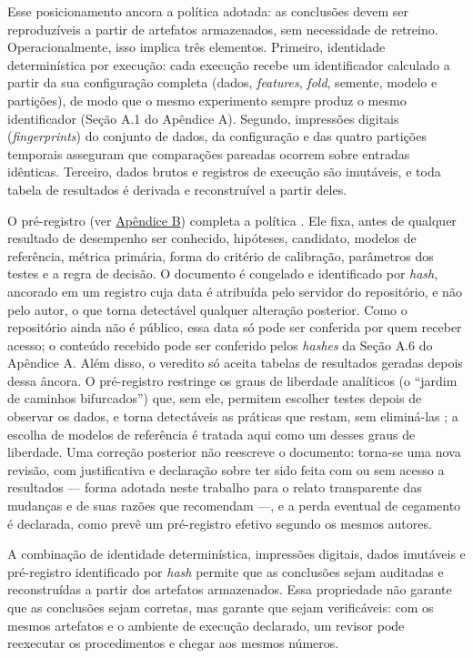 Esse posicionamento ancora a política adotada: as conclusões devem ser reproduzíveis a partir de artefatos armazenados, sem necessidade de retreino. Operacionalmente, isso implica três elementos. Primeiro, identidade determinística por execução: cada execução recebe um identificador calculado a partir da sua configuração completa (dados, \textit{features}, \textit{fold}, semente, modelo e partições), de modo que o mesmo experimento sempre produz o mesmo identificador (Seção A.1 do Apêndice A). Segundo, impressões digitais (\textit{fingerprints}) do conjunto de dados, da configuração e das quatro partições temporais asseguram que comparações pareadas ocorrem sobre entradas idênticas. Terceiro, dados brutos e registros de execução são imutáveis, e toda tabela de resultados é derivada e reconstruível a partir deles.

O pré-registro (ver \hyperref[gl:preregistro]{Apêndice B}) completa a política \cite{NOSEK2018}. Ele fixa, antes de qualquer resultado de desempenho ser conhecido, hipóteses, candidato, modelos de referência, métrica primária, forma do critério de calibração, parâmetros dos testes e a regra de decisão. O documento é congelado e identificado por \textit{hash}, ancorado em um registro cuja data é atribuída pelo servidor do repositório, e não pelo autor, o que torna detectável qualquer alteração posterior. Como o repositório ainda não é público, essa data só pode ser conferida por quem receber acesso; o conteúdo recebido pode ser conferido pelos \textit{hashes} da Seção A.6 do Apêndice A. Além disso, o veredito só aceita tabelas de resultados geradas depois dessa âncora. O pré-registro restringe os graus de liberdade analíticos (o ``jardim de caminhos bifurcados'') que, sem ele, permitem escolher testes depois de observar os dados, e torna detectáveis as práticas que restam, sem eliminá-las \cite{NOSEK2018}; a escolha de modelos de referência é tratada aqui como um desses graus de liberdade. Uma correção posterior não reescreve o documento: torna-se uma nova revisão, com justificativa e declaração sobre ter sido feita com ou sem acesso a resultados --- forma adotada neste trabalho para o relato transparente das mudanças e de suas razões que  recomendam ---, e a perda eventual de cegamento é declarada, como prevê um pré-registro efetivo segundo os mesmos autores.

A combinação de identidade determinística, impressões digitais, dados imutáveis e pré-registro identificado por \textit{hash} permite que as conclusões sejam auditadas e reconstruídas a partir dos artefatos armazenados. Essa propriedade não garante que as conclusões sejam corretas, mas garante que sejam verificáveis: com os mesmos artefatos e o ambiente de execução declarado, um revisor pode reexecutar os procedimentos e chegar aos mesmos números.

